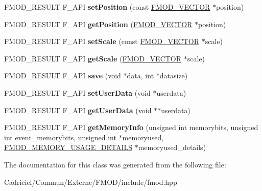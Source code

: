 \begin{DoxyCompactItemize}
\item 
F\+M\+O\+D\+\_\+\+R\+E\+S\+U\+LT F\+\_\+\+A\+PI {\bfseries set\+Position} (const \hyperlink{struct_f_m_o_d___v_e_c_t_o_r}{F\+M\+O\+D\+\_\+\+V\+E\+C\+T\+OR} $\ast$position)\hypertarget{class_f_m_o_d_1_1_geometry_a36ca90c62cbc0c37938a51750ce865e7}{}\label{class_f_m_o_d_1_1_geometry_a36ca90c62cbc0c37938a51750ce865e7}

\item 
F\+M\+O\+D\+\_\+\+R\+E\+S\+U\+LT F\+\_\+\+A\+PI {\bfseries get\+Position} (\hyperlink{struct_f_m_o_d___v_e_c_t_o_r}{F\+M\+O\+D\+\_\+\+V\+E\+C\+T\+OR} $\ast$position)\hypertarget{class_f_m_o_d_1_1_geometry_a2d0e4a6525b54cd9a39c447995eba296}{}\label{class_f_m_o_d_1_1_geometry_a2d0e4a6525b54cd9a39c447995eba296}

\item 
F\+M\+O\+D\+\_\+\+R\+E\+S\+U\+LT F\+\_\+\+A\+PI {\bfseries set\+Scale} (const \hyperlink{struct_f_m_o_d___v_e_c_t_o_r}{F\+M\+O\+D\+\_\+\+V\+E\+C\+T\+OR} $\ast$scale)\hypertarget{class_f_m_o_d_1_1_geometry_a46104dceeff4a02e5aae989f86951b2f}{}\label{class_f_m_o_d_1_1_geometry_a46104dceeff4a02e5aae989f86951b2f}

\item 
F\+M\+O\+D\+\_\+\+R\+E\+S\+U\+LT F\+\_\+\+A\+PI {\bfseries get\+Scale} (\hyperlink{struct_f_m_o_d___v_e_c_t_o_r}{F\+M\+O\+D\+\_\+\+V\+E\+C\+T\+OR} $\ast$scale)\hypertarget{class_f_m_o_d_1_1_geometry_a40f45f30258de49daf8bee7063afa9e9}{}\label{class_f_m_o_d_1_1_geometry_a40f45f30258de49daf8bee7063afa9e9}

\item 
F\+M\+O\+D\+\_\+\+R\+E\+S\+U\+LT F\+\_\+\+A\+PI {\bfseries save} (void $\ast$data, int $\ast$datasize)\hypertarget{class_f_m_o_d_1_1_geometry_a066a05c012e2d41f1ca929ab0328aa25}{}\label{class_f_m_o_d_1_1_geometry_a066a05c012e2d41f1ca929ab0328aa25}

\item 
F\+M\+O\+D\+\_\+\+R\+E\+S\+U\+LT F\+\_\+\+A\+PI {\bfseries set\+User\+Data} (void $\ast$userdata)\hypertarget{class_f_m_o_d_1_1_geometry_a9e7359878a030cf144cfdd773dfce85a}{}\label{class_f_m_o_d_1_1_geometry_a9e7359878a030cf144cfdd773dfce85a}

\item 
F\+M\+O\+D\+\_\+\+R\+E\+S\+U\+LT F\+\_\+\+A\+PI {\bfseries get\+User\+Data} (void $\ast$$\ast$userdata)\hypertarget{class_f_m_o_d_1_1_geometry_ab8502126a540d836f0fee179f2310c8f}{}\label{class_f_m_o_d_1_1_geometry_ab8502126a540d836f0fee179f2310c8f}

\item 
F\+M\+O\+D\+\_\+\+R\+E\+S\+U\+LT F\+\_\+\+A\+PI {\bfseries get\+Memory\+Info} (unsigned int memorybits, unsigned int event\+\_\+memorybits, unsigned int $\ast$memoryused, \hyperlink{struct_f_m_o_d___m_e_m_o_r_y___u_s_a_g_e___d_e_t_a_i_l_s}{F\+M\+O\+D\+\_\+\+M\+E\+M\+O\+R\+Y\+\_\+\+U\+S\+A\+G\+E\+\_\+\+D\+E\+T\+A\+I\+LS} $\ast$memoryused\+\_\+details)\hypertarget{class_f_m_o_d_1_1_geometry_a3dd06bc4077fac782ed5487c347ff14d}{}\label{class_f_m_o_d_1_1_geometry_a3dd06bc4077fac782ed5487c347ff14d}

\end{DoxyCompactItemize}


The documentation for this class was generated from the following file\+:\begin{DoxyCompactItemize}
\item 
Cadriciel/\+Commun/\+Externe/\+F\+M\+O\+D/include/fmod.\+hpp\end{DoxyCompactItemize}
